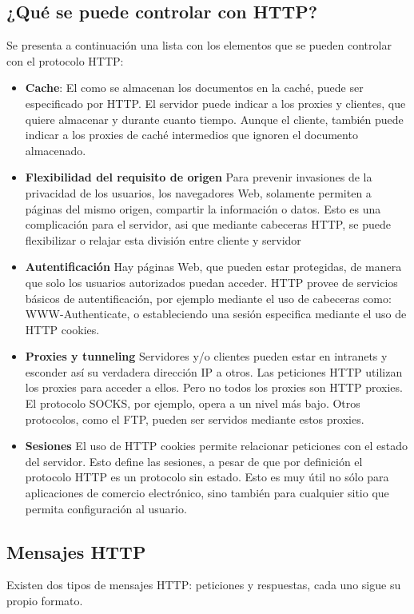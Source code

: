 \subsection{¿Qué se puede controlar con HTTP?}
Se presenta a continuación una lista con los elementos que se pueden controlar con el protocolo HTTP:
\begin{itemize}
	\item \textbf{Cache}: El como se almacenan los documentos en la caché, puede ser especificado por HTTP. El servidor puede indicar a los proxies y clientes, que quiere almacenar y durante cuanto tiempo. Aunque el cliente, también puede indicar a los proxies de caché intermedios que ignoren el documento almacenado.
	\item \textbf{Flexibilidad del requisito de origen} Para prevenir invasiones de la privacidad de los usuarios, los navegadores Web, solamente permiten a páginas del mismo origen, compartir la información o datos. Esto es una complicación para el servidor, asi que mediante cabeceras HTTP, se puede flexibilizar o relajar esta división entre cliente y servidor
	\item \textbf{Autentificación} Hay páginas Web, que pueden estar protegidas, de manera que solo los usuarios autorizados puedan acceder. HTTP provee de servicios básicos de autentificación, por ejemplo mediante el uso de cabeceras como:  WWW-Authenticate, o estableciendo una sesión especifica mediante el uso de  HTTP cookies. 
	\item \textbf{Proxies y  tunneling} Servidores y/o clientes pueden estar en intranets y esconder así su verdadera dirección IP a otros. Las peticiones HTTP utilizan los proxies para acceder a ellos. Pero no todos los proxies son HTTP proxies. El protocolo SOCKS, por ejemplo, opera a un nivel más bajo. Otros protocolos, como el FTP, pueden ser servidos mediante estos proxies.
	\item \textbf{Sesiones} El uso de HTTP cookies permite relacionar peticiones con el estado del servidor. Esto define las sesiones, a pesar de que por definición el protocolo HTTP es un protocolo sin estado. Esto es muy útil no sólo para aplicaciones de comercio electrónico, sino también para cualquier sitio que permita configuración al usuario.
\end{itemize}

\subsection{Mensajes HTTP}
Existen dos tipos de mensajes HTTP: peticiones y respuestas, cada uno sigue su propio formato.

